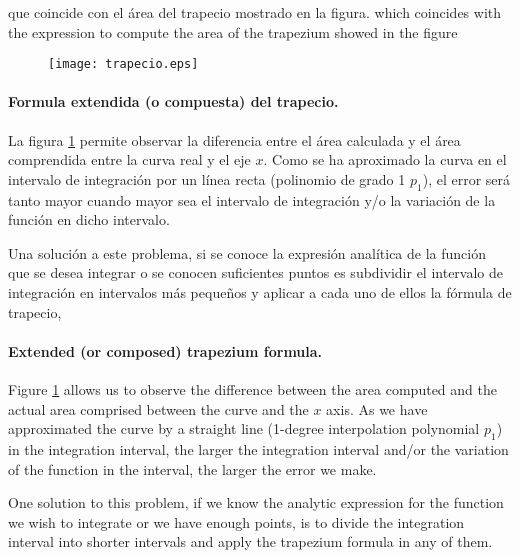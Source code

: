 \begin{paracol}{2}
que coincide con el área del trapecio mostrado en la figura.
\switchcolumn
which coincides with the expression to compute the area of the trapezium showed in the figure
\end{paracol}
\begin{figure}[h]
\centering
\texttt{[image: trapecio.eps]}
\label{fig:trapecio}
\end{figure}
\begin{paracol}{2}
\paragraph*{Formula extendida (o compuesta) del trapecio.} La figura \ref{fig:trapecio} permite observar la diferencia entre el área calculada y el área comprendida entre la curva real y el eje $x$. Como se ha aproximado  la curva en el intervalo de integración por un línea recta (polinomio de grado 1 $p_1$), el error será tanto mayor cuando mayor sea el intervalo de integración y/o la variación de la función en dicho intervalo.

 Una solución a este problema, si se conoce la expresión analítica de la función que  se desea integrar o se conocen suficientes puntos es subdividir el intervalo de integración en intervalos más pequeños y aplicar a cada uno de ellos la fórmula de trapecio,
\switchcolumn
\paragraph{Extended (or composed) trapezium formula.}  Figure \ref{fig:trapecio} allows us to observe the difference between the area computed and the actual area comprised between the curve and the $x$ axis. As we have approximated the curve by a straight line (1-degree interpolation polynomial $p_1$) in the integration interval, the larger the integration interval and/or the variation of the function in the interval, the larger the error we make.

One solution to this problem, if we know the analytic expression for the function we wish to integrate or we have enough points, is to divide the integration interval into shorter intervals and apply the trapezium formula in any of them.

   
\end{paracol}
